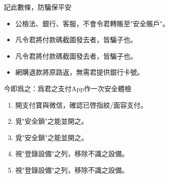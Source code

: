 \begin{tcbwarn}{記此數條，防騙保平安}
\begin{itemize}
  \item 公檢法、銀行、客服，不會令君轉賬至"安全賬戶"。
  \item 凡令君將付款碼截圖發去者，皆騙子也。
  \item 凡令君將付款碼截圖發去者，皆騙子也。
  \item 網購退款將原路返，無需君提供銀行卡號。
\end{itemize}

\end{tcbwarn}

\begin{tcbpractice}{今即爲之：爲君之支付App作一次安全體檢}
\begin{enumerate}
  \item 開支付寶與微信，確認已啓指紋/面容支付。
  \item 覓"安全鎖"之能並開之。
  \item 覓"安全鎖"之能並開之。
  \item 視"登錄設備"之列，移除不識之設備。
  \item 視"登錄設備"之列，移除不識之設備。
\end{enumerate}

\end{tcbpractice}
